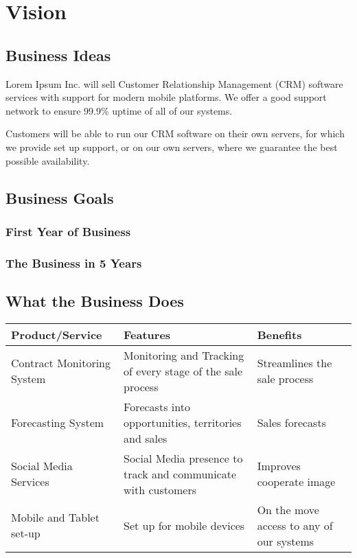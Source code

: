 \documentclass[DIV=calc, paper=a4, fontsize=11pt]{scrartcl}	 %
\begin{document}
\section{Vision}

\subsection{Business Ideas}
Lorem Ipsum Inc. will sell Customer Relationship Management (CRM) software services with support
for modern mobile platforms. We offer a good support network to ensure 99.9\% uptime of all of our
systems.

Customers will be able to run our CRM software on their own servers, for which we provide set up
support, or on our own servers, where we guarantee the best possible availability.

\subsection{Business Goals}
\subsubsection*{First Year of Business}
\subsubsection*{The Business in 5 Years}

\subsection{What the Business Does}
\begin{tabular}{|l|p{}|p{}|}\hline
Product/Service & Features & Benefits \\ \hline
Contract Monitoring System & Monitoring and Tracking of every stage of the sale process & Streamlines the sale process \\ \hline
Forecasting System & Forecasts into opportunities, territories and sales & Sales forecasts \\ \hline
Social Media Services & Social Media presence to track and communicate with customers & Improves cooperate image \\ \hline
Mobile and Tablet set-up & Set up for mobile devices & On the move access to any of our systems \\ \hline
\end{tabular}
\end{document}
